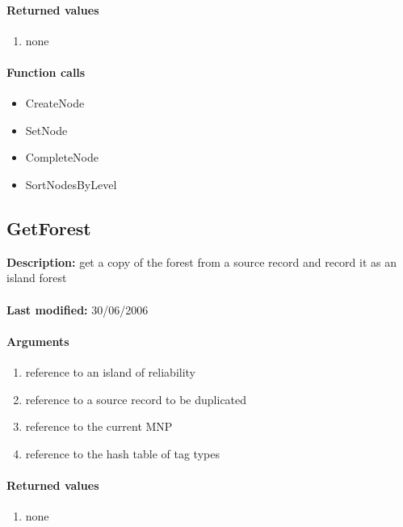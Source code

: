 \paragraph{Returned values}
\begin{enumerate}
\item none
\end{enumerate}

\paragraph{Function calls}
\begin{itemize}
\item CreateNode
\item SetNode
\item CompleteNode
\item SortNodesByLevel
\end{itemize}

\subsection{GetForest}
\textbf{Description:} get a copy of the forest from a source record and record it as an island forest\\
\\\textbf{Last modified:} 30/06/2006

\paragraph{Arguments}
\begin{enumerate}
\item reference to an island of reliability
\item reference to a source record to be duplicated
\item reference to the current MNP
\item reference to the hash table of tag types
\end{enumerate}

\paragraph{Returned values}
\begin{enumerate}
\item none
\end{enumerate}

